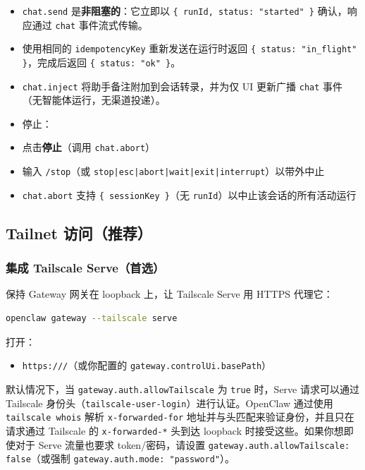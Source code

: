 \begin{itemize}
  \item \texttt{chat.send} 是\textbf{非阻塞的}：它立即以 \texttt{\{ runId, status: "started" \}} 确认，响应通过 \texttt{chat} 事件流式传输。
  \item 使用相同的 \texttt{idempotencyKey} 重新发送在运行时返回 \texttt{\{ status: "in\_flight" \}}，完成后返回 \texttt{\{ status: "ok" \}}。
  \item \texttt{chat.inject} 将助手备注附加到会话转录，并为仅 UI 更新广播 \texttt{chat} 事件（无智能体运行，无渠道投递）。
  \item 停止：
  \item 点击\textbf{停止}（调用 \texttt{chat.abort}）
  \item 输入 \texttt{/stop}（或 \texttt{stop|esc|abort|wait|exit|interrupt}）以带外中止
  \item \texttt{chat.abort} 支持 \texttt{\{ sessionKey \}}（无 \texttt{runId}）以中止该会话的所有活动运行
\end{itemize}


\subsection{Tailnet 访问（推荐）}


\subsubsection{集成 Tailscale Serve（首选）}


保持 Gateway 网关在 loopback 上，让 Tailscale Serve 用 HTTPS 代理它：

\begin{lstlisting}[language=bash]
openclaw gateway --tailscale serve
\end{lstlisting}


打开：

\begin{itemize}
  \item \texttt{https:///}（或你配置的 \texttt{gateway.controlUi.basePath}）
\end{itemize}


默认情况下，当 \texttt{gateway.auth.allowTailscale} 为 \texttt{true} 时，Serve 请求可以通过 Tailscale 身份头（\texttt{tailscale-user-login}）进行认证。OpenClaw 通过使用 \texttt{tailscale whois} 解析 \texttt{x-forwarded-for} 地址并与头匹配来验证身份，并且只在请求通过 Tailscale 的 \texttt{x-forwarded-*} 头到达 loopback 时接受这些。如果你想即使对于 Serve 流量也要求 token/密码，请设置 \texttt{gateway.auth.allowTailscale: false}（或强制 \texttt{gateway.auth.mode: "password"}）。

